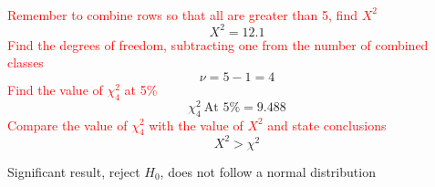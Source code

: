 \documentclass{article}[18pt]
\begin{document}
\\
\textcolor{red}{Remember to combine rows so that all are greater than 5, find $X^2$}
$$X^2=12.1$$
\textcolor{red}{Find the degrees of freedom, subtracting one from the number of combined classes}
$$\nu=5-1=4$$
\textcolor{red}{Find the value of $\chi^2_4$ at 5\%}
$$\chi^2_4 \ \textrm{At 5\%}=9.488$$
\textcolor{red}{Compare the value of $\chi^2_4$ with the value of $X^2$ and state conclusions}
$$X^2>\chi^2$$
\begin{center}
Significant result, reject $H_0$, does not follow a normal distribution
\end{center}
\end{document}
